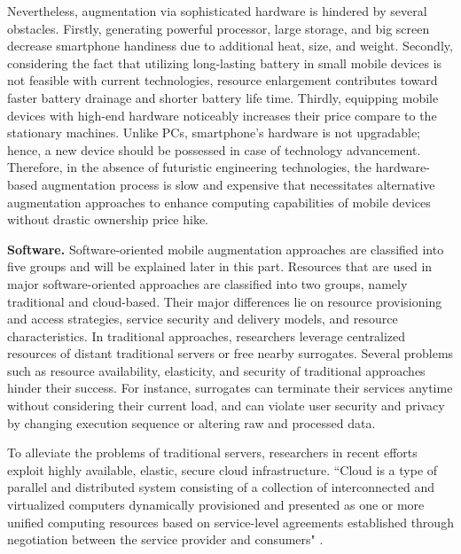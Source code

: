 \documentclass[publish]{IEEEtran}
\begin{document}
Nevertheless, augmentation via sophisticated hardware is hindered by several obstacles. Firstly, generating powerful processor, large storage, and big screen decrease smartphone handiness due to additional heat, size, and weight. Secondly, considering the fact that utilizing long-lasting battery in small mobile devices is not feasible with current technologies, resource enlargement contributes toward faster battery drainage and shorter battery life time. Thirdly, equipping mobile devices with high-end hardware noticeably increases their price compare to the stationary machines. Unlike PCs, smartphone's hardware is not upgradable; hence, a new device should be possessed in case of technology advancement. Therefore, in the absence of futuristic engineering technologies, the hardware-based augmentation process is slow and expensive that necessitates alternative augmentation approaches to enhance computing capabilities of mobile devices without drastic ownership price hike.

\noindent \textbf{Software.}  \label{Softwareaugmentation}
Software-oriented mobile augmentation approaches are classified into five groups and will be explained later in this part. Resources that are used in major software-oriented approaches are classified into two groups, namely traditional and cloud-based. Their major differences lie on resource provisioning and access strategies, service security and delivery models, and resource characteristics. In traditional approaches, researchers leverage centralized resources of distant traditional servers or free nearby surrogates. Several problems such as resource availability, elasticity, and security of traditional approaches hinder their success. For instance, surrogates can terminate their services anytime without considering their current load, and can violate user security and privacy by changing execution sequence or altering raw and processed data.
 
To alleviate the problems of traditional servers, researchers in recent efforts \cite{Chuna, Chun2009, Kemp2010, Kemp2010a, Kempa,Guo2011, Zhang2011, cuervo2010maui,Chun2011,Verbelen2012,Altamimi2012} exploit highly available, elastic, secure cloud infrastructure. ``Cloud is a type of parallel and distributed system consisting of a collection of interconnected and virtualized computers dynamically provisioned and presented as one or more unified computing resources based on service-level agreements established through negotiation between the service provider and consumers" \cite{buyya2009cloud}.
\end{document}
